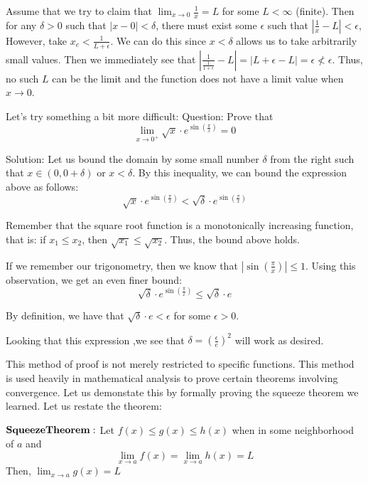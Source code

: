 \documentclass[12pt]{article}
\theoremstyle{remark}
\begin{document}
 
 Assume that we try to claim that $\lim_{x \rightarrow 0} \frac{1}{x} = L$ for some $L < \infty$ (finite). Then for any $\delta > 0$ such that $|x - 0| < \delta$, there must exist some $\epsilon$ such that $|\frac{1}{x} - L | < \epsilon$, 
 However, take $x_e< \frac{1}{L + \epsilon}$. We can do this since $x < \delta$ allows us to take arbitrarily small values. Then we immediately see that $|\frac{1}{\frac{1}{1 + \epsilon}} - L|  = |L+ \epsilon - L | = \epsilon \not< \epsilon$. Thus, no such $L$ can be the limit and the function does not have a limit value when $x \rightarrow 0$. 
  
Let's try something a bit more difficult:
Question: Prove that $$ \lim_{x \rightarrow 0^+} \sqrt{x} \cdot e^{\sin(\frac{\pi}{x})} = 0 $$
 
Solution: Let us bound the domain by some small number $\delta$ from the right such that $x \in (0,0+\delta)$ or $x < \delta$. By this inequality, we can bound the expression above as follows:
$$ \sqrt{x} \cdot e^{\sin(\frac{\pi}{x})} < \sqrt{\delta} \cdot e^{\sin(\frac{\pi}{x})} $$

Remember that the square root function is a monotonically increasing function, that is: if $x_1 \leq x_2$, then $\sqrt{x_1} \leq \sqrt{x_2}$. Thus, the bound above holds.

If we remember our trigonometry, then we know that $|\sin(\frac{\pi}{x})| \leq 1$. Using this observation, we get an even finer bound:
$$\sqrt{\delta} \cdot e^{\sin(\frac{\pi}{x})} \leq \sqrt{\delta} \cdot e $$

By definition, we have that $\sqrt{\delta} \cdot e < \epsilon$ for some $\epsilon > 0$.

Looking that this expression ,we see that $\delta = (\frac{\epsilon}{e})^2$ will work as desired. 
 
This method of proof is not merely restricted to specific functions. This method is used heavily in mathematical analysis to prove certain theorems involving convergence. Let us demonstate this by formally proving the squeeze theorem we learned. Let us restate the theorem:

$\bf{Squeeze Theorem:}$ Let $f(x) \leq g(x) \leq h(x)$ when in some neighborhood of $a$ and
$$\lim_{x \rightarrow a} f(x) = \lim_{x \rightarrow a} h(x) = L$$ Then, $\lim_{x \rightarrow a} g(x) = L$
 
\end{document}
